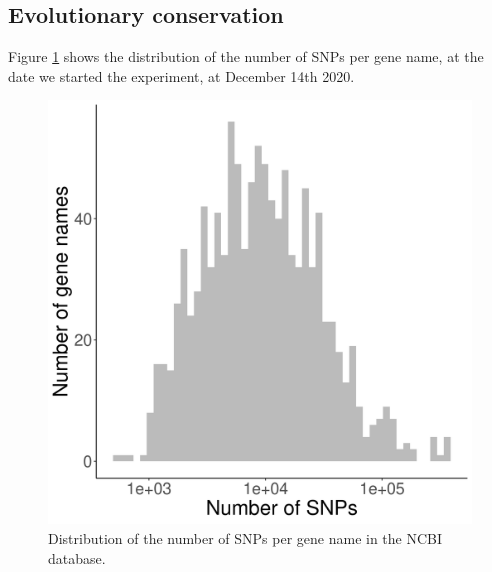 \clearpage

\subsection{Evolutionary conservation}

Figure \ref{fig:snps_per_gene_name_ncbi} shows the distribution of the
number of SNPs per gene name, at the date we started the experiment,
at December 14th 2020.

\begin{figure}[!htbp]
  \includegraphics[width=\textwidth]{ncbi_peregrine_results/fig_snps_per_gene_name_ncbi.png}
  \caption{
    Distribution of the number of SNPs per gene name in the NCBI database.
  }
  \label{fig:snps_per_gene_name_ncbi}
\end{figure}

